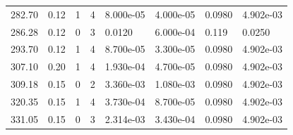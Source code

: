 \documentclass[preview]{standalone}
\begin{document}
{{\begin{tabular}{L{1.2cm}C{1.2cm} C{0.3cm}C{0.5cm} C{1.4cm}C{1.4cm} C{1.4cm}C{1.4cm}}
  282.70  &  0.12  & 1     &  4 &  8.000e-05  & 4.000e-05  & 0.0980 &  4.902e-03   \\ 
  286.28  &  0.12  & 0     &  3 &  0.0120  & 6.000e-04  & 0.119 &  0.0250   \\ 
  293.70  &  0.12  & 1     &  4 &  8.700e-05  & 3.300e-05  & 0.0980 &  4.902e-03   \\ 
  307.10  &  0.20  & 1     &  4 &  1.930e-04  & 4.700e-05  & 0.0980 &  4.902e-03   \\ 
  309.18  &  0.15  & 0     &  2 &  3.360e-03  & 1.080e-03  & 0.0980 &  4.902e-03   \\ 
  320.35  &  0.15  & 1     &  4 &  3.730e-04  & 8.700e-05  & 0.0980 &  4.902e-03   \\ 
  331.05  &  0.15  & 0     &  3 &  2.314e-03  & 3.430e-04  & 0.0980 &  4.902e-03   \\ 
\hline 
\end{tabular} 

}}
\end{document}
